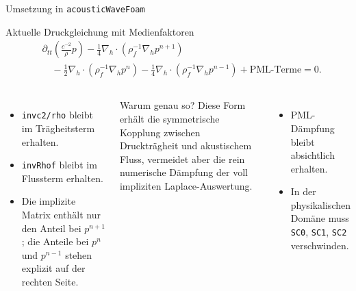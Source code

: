 \documentclass[
	german,%
	accentcolor=9c,%
	accept-missing-logos=true,%
]{tudabeamer}
\newcommand*{\code}[1]{\texttt{#1}}
\begin{document}
\begin{frame}{Umsetzung in \code{acousticWaveFoam}}
    \scriptsize
    \setlength{\abovedisplayskip}{0.04cm}
    \setlength{\belowdisplayskip}{0.04cm}
    \begin{block}{Aktuelle Druckgleichung mit Medienfaktoren}
        \[
        \begin{aligned}
            &\partial_{tt}\left(\frac{c^{-2}}{\rho}p\right)
            -\frac14\nabla_h\cdot\left(\rho_f^{-1}\nabla_h p^{n+1}\right)\\
            &\quad
            -\frac12\nabla_h\cdot\left(\rho_f^{-1}\nabla_h p^n\right)
            -\frac14\nabla_h\cdot\left(\rho_f^{-1}\nabla_h p^{n-1}\right)
            +\text{PML-Terme}=0 .
        \end{aligned}
        \]
    \end{block}

    \begin{columns}[T]
    \begin{itemize}
        \setlength{\itemsep}{0.05cm}
        \item \code{invc2/rho} bleibt im Trägheitsterm erhalten.
        \item \code{invRhof} bleibt im Flussterm erhalten.
        \item Die implizite Matrix enthält nur den Anteil bei $p^{n+1}$;
        die Anteile bei $p^n$ und $p^{n-1}$ stehen explizit auf der rechten Seite.
    \end{itemize}

    \begin{block}{Warum genau so?}
        Diese Form erhält die symmetrische Kopplung zwischen Druckträgheit und
        akustischem Fluss, vermeidet aber die rein numerische Dämpfung der
        voll impliziten Laplace-Auswertung.
    \end{block}
    \begin{itemize}
        \setlength{\itemsep}{0.05cm}
        \item PML-Dämpfung bleibt absichtlich erhalten.
        \item In der physikalischen Domäne muss \code{SC0}, \code{SC1},
        \code{SC2} verschwinden.
    \end{itemize}
    \end{columns}
\end{frame}
\end{document}
